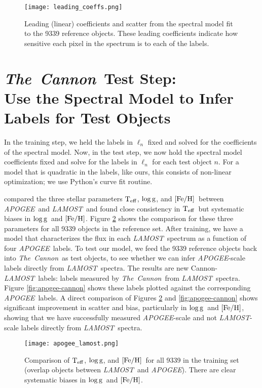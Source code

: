 \documentclass[12pt, preprint]{aastex}
\newcommand{\tc}{\textsl{The~Cannon}}
\newcommand{\apogee}{\textsl{APOGEE}}
\newcommand{\lamost}{\textsl{LAMOST}}
\newcommand{\set}[1]{\bm{#1}}
\newcommand{\teff}{\mbox{$\rm T_{eff}$}}
\newcommand{\feh}{\mbox{$\rm [Fe/H]$}}
\newcommand{\logg}{\mbox{$\rm \log g$}}
\newcommand{\starlabel}{\ell}
\newcommand{\starlabelvec}{\set{\starlabel}}
\begin{document}
\begin{figure}[h!]
\centering
\texttt{[image: leading\_coeffs.png]}
\caption{Leading (linear) coefficients and scatter from the spectral model fit to the 9339 reference objects. These leading coefficients indicate how sensitive each pixel in the spectrum is to each of the labels.}
\label{fig:leading-coeffs}
\end{figure}

\section{\tc\ Test Step: \\ Use the Spectral Model to Infer Labels for Test Objects}

In the training step, we held the labels in $\starlabelvec_n$ fixed and 
solved for the coefficients of the spectral model. 
Now, in the test step, we now hold the spectral model coefficients fixed 
and solve for the labels in $\starlabelvec_n$ for each test object $n$. 
For a model that is quadratic in the labels, like ours, this consists of 
non-linear optimization; we use Python's curve fit routine. 

\citet{Chen2015} compared the three stellar parameters \teff, \logg, and 
\feh\ between \apogee\ and \lamost\ and found close consistency in \teff\
but systematic biases in \logg\ and \feh. Figure \ref{fig:apogee-lamost} 
shows the comparison for these three parameters for all 9339 objects in 
the reference set. After training, we have a model that characterizes the flux 
in each \lamost\ spectrum as a function of four \apogee\ labels. 
To test our model, we feed the 9339 reference objects back into \tc\ as 
test objects, to see whether we can infer \apogee-scale labels directly from
\lamost\ spectra. The results are new Cannon-\lamost\ labels: labels measured
by \tc\ from \lamost\ spectra. Figure \ref{fig:apogee-cannon} shows these labels
plotted against the corresponding \apogee\ labels. A direct comparison of
Figures \ref{fig:apogee-lamost} and \ref{fig:apogee-cannon} shows significant
improvement in scatter and bias, particularly in \logg\ and \feh, showing that
we have successfully measured \apogee-scale and not \lamost-scale labels 
directly from \lamost\ spectra. 

\begin{figure}[h!]
\centering
\texttt{[image: apogee\_lamost.png]}
\caption{Comparison of \teff, \logg, and \feh\ for all 9339 in the training set (overlap
objects between \lamost\ and \apogee). There are clear systematic biases in \logg\
and \feh.}
\label{fig:apogee-lamost}
\end{figure}
\end{document}
